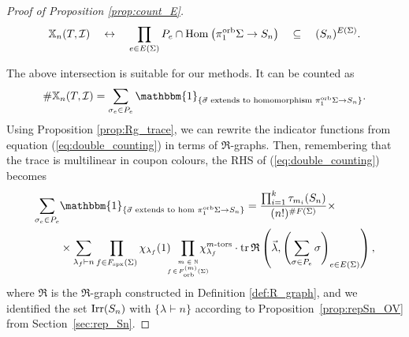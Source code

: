 \documentclass{amsart}
\newcommand{\covers}{\mathbb{X}_n}
\newcommand{\Fspx}{F_{\textnormal{spx}}}
\newcommand{\Forb}[1][m]{F^{(#1)}_{\textnormal{orb}}}
\newcommand{\Hom}[3][]{\tn{Hom}_{#1}\left(#2\to #3\right)}
\newcommand{\iterorb}{{\tiny\begin{matrix}m\in\mathbb{N}\\f\!\in\!\Forb(\Sigma)\end{matrix}}}
\newcommand{\pio}{\pi_1^{\textnormal{orb}}}
\newcommand{\tn}{\textnormal}
\newcommand{\tr}{\operatorname{tr}}
\begin{document}
\begin{proof}[Proof of Proposition \ref{prop:count_E}]
\begin{equation*}
\covers(T,\mathcal{I})\quad\leftrightarrow\quad\prod_{e\in E(\Sigma)}P_e\cap\Hom{\pio\Sigma}{S_n}\quad\subseteq\quad(S_n)^{E(\Sigma)}.
\end{equation*}

The above intersection is suitable for our methods. It can be counted as
\begin{equation}\label{eq:double_counting}
\#\covers(T,\mathcal{I})=\sum_{\sigma_e\in P_e}\mathbbm{1}_{\{\vec\sigma\tn{ extends to homomorphism }\pio\Sigma\to S_n\}}.
\end{equation}
Using Proposition \ref{prop:Rg_trace}, we can rewrite the indicator functions from equation (\ref{eq:double_counting}) in terms of $\mathfrak{R}$-graphs. Then, remembering that the trace is multilinear in coupon colours, the RHS of (\ref{eq:double_counting}) becomes
\begin{align}\begin{split}\label{eq:sum_Rgraphs}
\sum_{\sigma_e\in P_e}&\mathbbm{1}_{\{\vec\sigma\tn{ extends to hom }\pio\Sigma\to S_n\}}=\frac{\prod_{i=1}^k\tau_{m_i}(S_n)}{(n!)^{\#F(\Sigma)}}\times\\
&\times\sum_{\lambda_f\vdash n}\prod_{f\in\Fspx(\Sigma)}\chi_{\lambda_f}(1)\hspace*{-5pt}\prod_\iterorb\hspace*{-10pt}\chi_{\lambda_f}^{m\tn{-tors}}\cdot\tr\mathfrak{R}\left(\vec\lambda,\left(\sum_{\sigma\in P_e}\sigma\right)_{e\in E(\Sigma)}\right),
\end{split}\end{align}
where $\mathfrak{R}$ is the $\mathfrak{R}$-graph constructed in Definition \ref{def:R_graph}, and we identified the set $\tn{Irr}(S_n)$ with $\{\lambda\vdash n\}$ according to Proposition~\ref{prop:repSn_OV} from Section~\ref{sec:rep_Sn}.


\end{proof}
\end{document}
